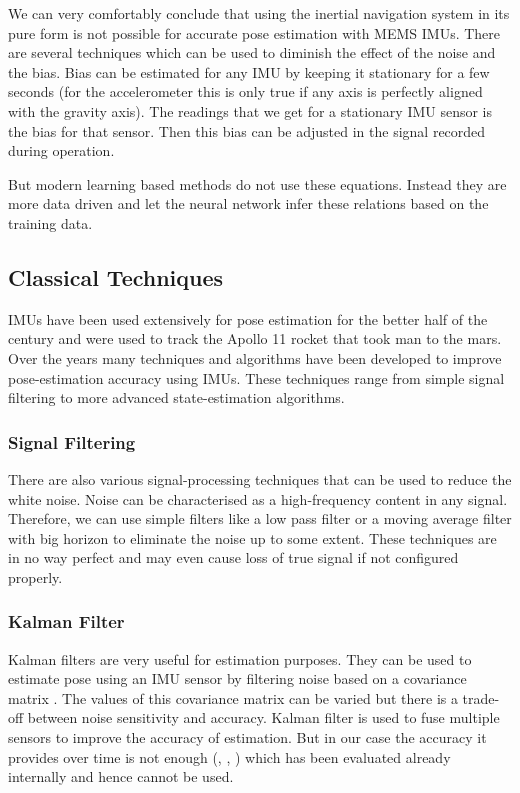 We can very comfortably conclude that using the inertial navigation system in its pure form is not possible for accurate pose estimation with MEMS IMUs. There are several techniques which can be used to diminish the effect of the noise and the bias. Bias can be estimated for any IMU by keeping it stationary for a few seconds  (for the accelerometer this is only true if any axis is perfectly aligned with the gravity axis). The readings that we get for a stationary IMU sensor is the bias for that sensor. Then this bias can be adjusted in the signal recorded during operation.

But modern learning based methods do not use these equations. Instead they are more data driven and let the neural network infer these relations based on the training data.

\subsection{Classical Techniques}
IMUs have been used extensively for pose estimation for the better half of the century and were used to track the Apollo 11 rocket that took man to the mars. Over the years many techniques and algorithms have been developed to improve pose-estimation accuracy using IMUs. These techniques range from simple signal filtering to more advanced state-estimation algorithms.

\subsubsection{Signal Filtering}
There are also various signal-processing techniques that can be used to reduce the white noise. Noise can be characterised as a high-frequency content in any signal. Therefore, we can use simple filters like a low pass filter or a moving average filter with big horizon to eliminate the noise up to some extent. These techniques are in no way perfect and may even cause loss of true signal if not configured properly.

\subsubsection{Kalman Filter}
Kalman filters are very useful for estimation purposes. They can be used to estimate pose using an IMU sensor by filtering noise based on a covariance matrix \citep{ferdinando2012embedded}. The values of this covariance matrix can be varied but there is a trade-off between noise sensitivity and accuracy. Kalman filter is used to fuse multiple sensors to improve the accuracy of estimation. But in our case the accuracy it provides over time is not enough (\citep{kok2017using}, \citep{alatise2017pose}, \citep{bangera2020mems}) which has been evaluated already internally and hence cannot be used.

